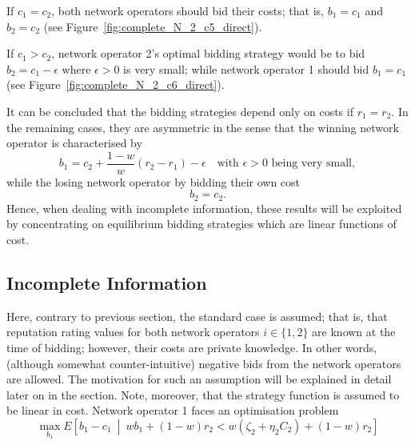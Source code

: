 If $c_1 = c_2$, both network operators should bid their costs; that is, $b_1 = c_1$ and $b_2 = c_2$ (see Figure~\ref{fig:complete_N_2_c5_direct}).

If $c_1 > c_2$, network operator 2's optimal bidding strategy would be to bid $b_2 = c_1 - \epsilon$ where $\epsilon>0$ is very small; while network operator 1 should bid $b_1 = c_1$ (see Figure~\ref{fig:complete_N_2_c6_direct}).

It can be concluded that the bidding strategies depend only on costs if $r_1 = r_2$. In the remaining cases, they are asymmetric in the sense that the winning network operator is characterised by
\begin{equation}
	b_1 = c_2 + \frac{1-w}{w}(r_2 - r_1) - \epsilon \quad\text{with }\epsilon>0\text{ being very small},
\end{equation}
while the losing network operator by bidding their own cost
\begin{equation}
	b_2 = c_2.
\end{equation}
Hence, when dealing with incomplete information, these results will be exploited by concentrating on equilibrium bidding strategies which are linear functions of cost.

\subsection{Incomplete Information} %
\label{sub:incomplete_information_n_2_direct}
Here, contrary to previous section, the standard case is assumed; that is, that reputation rating values for both network operators $i\in\{1,2\}$ are known at the time of bidding; however, their costs are private knowledge.  In other words, (although somewhat counter-intuitive) negative bids from the network operators are allowed. The motivation for such an assumption will be explained in detail later on in the section. Note, moreover, that the strategy function is assumed to be linear in cost. Network operator 1 faces an optimisation problem
\begin{equation}
	\label{eq:pcomp_exp_utility_uc_direct}
	\max_{b_1}E \left[ b_1-c_1 \:\middle\vert\: wb_1 + (1-w)r_2 < w(\zeta_2 + \eta_2 C_2) + (1-w)r_2\right]
\end{equation}

